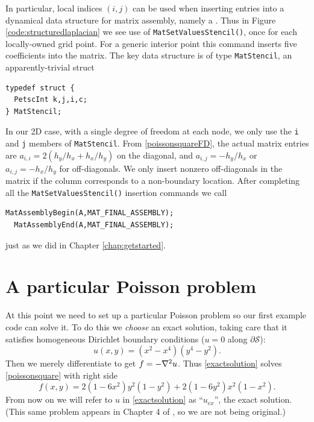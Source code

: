 In particular, local indices $(i,j)$ can be used when inserting entries into a dynamical data structure for matrix assembly, namely a \pMat.  Thus in Figure \ref{code:structuredlaplacian} we see use of \texttt{MatSetValuesStencil()}, once for each locally-owned grid point.  For a generic interior point this command inserts five coefficients into the matrix.  The key data structure is of type \texttt{MatStencil}, an apparently-trivial struct
\begin{Verbatim}[fontsize=\small]
typedef struct {
  PetscInt k,j,i,c;
} MatStencil;
\end{Verbatim}
In our 2D case, with a single degree of freedom at each node, we only use the \texttt{i} and \texttt{j} members of \texttt{MatStencil}.  From \eqref{poissonsquareFD}, the actual matrix entries are $a_{i,i} = 2\left(h_y/h_x + h_x/h_y\right)$ on the diagonal, and $a_{i,j} = -h_y/h_x$ or $a_{i,j} = -h_x/h_y$ for off-diagonals.  We only insert nonzero off-diagonals in the matrix if the column corresponds to a non-boundary location.  After completing all the \texttt{MatSetValuesStencil()} insertion commands we call 
\begin{Verbatim}[fontsize=\small]
  MatAssemblyBegin(A,MAT_FINAL_ASSEMBLY);
  MatAssemblyEnd(A,MAT_FINAL_ASSEMBLY);
\end{Verbatim}
just as we did in Chapter \ref{chap:getstarted}.


\section{A particular Poisson problem}

At this point we need to set up a particular Poisson problem so our first example code can solve it.  To do this we \emph{choose} an exact solution, taking care that it satisfies homogeneous Dirichlet boundary conditions ($u=0$ along $\partial \mathcal{S}$):
\begin{equation}
u(x,y) = (x^2 - x^4) (y^4 - y^2). \label{exactsolution}
\end{equation}
Then we merely differentiate to get $f = -\nabla^2 u$.  Thus \eqref{exactsolution} solves \eqref{poissonsquare} with right side
\begin{equation}
f(x,y) = 2 (1 - 6 x^2) y^2 (1 - y^2) + 2 (1 - 6 y^2) x^2 (1 - x^2).\label{manufacturedf}
\end{equation}
From now on we will refer to $u$ in \eqref{exactsolution} as ``$u_{ex}$'', the exact solution.  (This same problem appears in Chapter 4 of \citep{Briggsetal2000}, so we are not being original.) %


